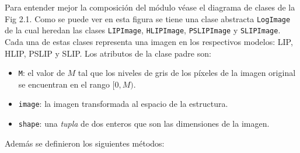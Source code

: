 Para entender mejor la composici\'on del m\'odulo v\'ease el diagrama de clases de la Fig 2.1. Como se puede ver en esta figura se tiene una clase abstracta \verb|LogImage| de la cual heredan las clases \verb|LIPImage|, \verb|HLIPImage|, \verb|PSLIPImage| y \verb|SLIPImage|. Cada una de estas clases representa una imagen en los respectivos modelos: LIP, HLIP, PSLIP y SLIP. Los atributos de la clase padre son:

\begin{itemize}
	\item \verb|M|: el valor de $M$ tal que los niveles de gris de los p\'ixeles de la imagen original se encuentran en el rango $[0,M)$.
	\item \verb|image|: la imagen transformada al espacio de la estructura.
	\item \verb|shape|: una \textit{tupla} de dos enteros que son las dimensiones de la imagen.
\end{itemize}

Adem\'as se definieron los siguientes m\'etodos:

